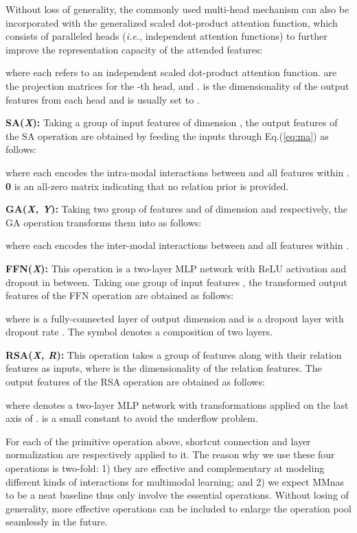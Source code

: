 \documentclass[sigconf]{acmart}
\begin{document}
Without loss of generality, the commonly used multi-head mechanism \cite{vaswani2017attention} can also be incorporated with the generalized scaled dot-product attention function, which consists of  paralleled heads (\emph{i.e.}, independent attention functions) to further improve the representation capacity of the attended features:

where each  refers to an independent scaled dot-product attention function.  are the projection matrices for the -th head, and .  is the dimensionality of the output features from each head and is usually set to .

\noindent\textbf{SA(\textit{X}):} Taking a group of input features  of dimension , the output features  of the \textsf{SA} operation are obtained by feeding the inputs through Eq.(\ref{eq:ma}) as follows:

where each  encodes the intra-modal interactions between  and all features within . \textbf{0} is an all-zero matrix indicating that no relation prior is provided.

\noindent\textbf{GA(\textit{X, Y}):} Taking two group of features  and   of dimension  and  respectively, the \textsf{GA} operation transforms them into  as follows:

where each  encodes the inter-modal interactions between  and all features within .

\noindent\textbf{FFN(\textit{X}):} This operation is a two-layer MLP network with ReLU activation and dropout in between. Taking one group of input features , the transformed output features  of the \textsf{FFN} operation are obtained as follows:

where  is a fully-connected layer of output dimension  and  is a dropout layer with dropout rate . The symbol  denotes a composition of two layers.

\noindent\textbf{RSA(\textit{X, R}):} This operation takes a group of features  along with their relation features  as inputs, where  is the dimensionality of the relation features. The output features  of the \textsf{RSA} operation are obtained as follows:

where  denotes a two-layer MLP network with transformations applied on the last axis of .  is a small constant to avoid the underflow problem.

For each of the primitive operation above, shortcut connection \cite{he2015deep} and layer normalization \cite{ba2016layer} are respectively applied to it. The reason why we use these four operations is two-fold: 1) they are effective and complementary at modeling different kinds of interactions for multimodal learning; and 2) we expect MMnas to be a neat baseline thus only involve the essential operations. Without losing of generality, more effective operations can be included to enlarge the operation pool seamlessly in the future.
\end{document}
